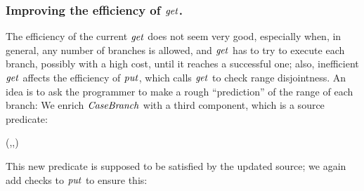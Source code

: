 \subsubsection{Improving the efficiency of \ensuremath{\Varid{get}}.}

The efficiency of the current \ensuremath{\Varid{get}} does not seem very good, especially when, in general, any number of branches is allowed, and \ensuremath{\Varid{get}} has to try to execute each branch, possibly with a high cost, until it reaches a successful one; also, inefficient \ensuremath{\Varid{get}} affects the efficiency of \ensuremath{\Varid{put}}, which calls \ensuremath{\Varid{get}} to check range disjointness.
An idea is to ask the programmer to make a rough ``prediction'' of the range of each branch:
We enrich \ensuremath{\Conid{CaseBranch}} with a third component, which is a source predicate:
\begin{hscode}\SaveRestoreHook
{}%
%
\>[B]{}\;\;\;\mathrel{=}(\to {}\to {},\;\;,\to {}){}\<[E]%
\ColumnHook
\end{hscode}\resethooks
This new predicate is supposed to be satisfied by the updated source; we again add checks to \ensuremath{\Varid{put}} to ensure this:
